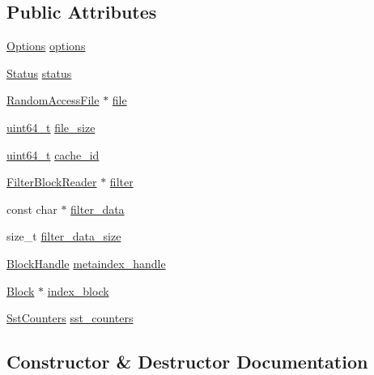 \subsection*{Public Attributes}
\begin{DoxyCompactItemize}
\item 
\hyperlink{structleveldb_1_1_options}{Options} \hyperlink{structleveldb_1_1_table_1_1_rep_a96ff2b389369e1b0706b090961065740}{options}
\item 
\hyperlink{classleveldb_1_1_status}{Status} \hyperlink{structleveldb_1_1_table_1_1_rep_aceaddad6024db9f34af2358503e4c089}{status}
\item 
\hyperlink{classleveldb_1_1_random_access_file}{Random\+Access\+File} $\ast$ \hyperlink{structleveldb_1_1_table_1_1_rep_a5b96b0d545bb3dbe2bccdefab1a83092}{file}
\item 
\hyperlink{stdint_8h_aaa5d1cd013383c889537491c3cfd9aad}{uint64\+\_\+t} \hyperlink{structleveldb_1_1_table_1_1_rep_a4efe31776f1009ac17b47cf2388bc84c}{file\+\_\+size}
\item 
\hyperlink{stdint_8h_aaa5d1cd013383c889537491c3cfd9aad}{uint64\+\_\+t} \hyperlink{structleveldb_1_1_table_1_1_rep_af5beb2186a60560f5381271ad53420b8}{cache\+\_\+id}
\item 
\hyperlink{classleveldb_1_1_filter_block_reader}{Filter\+Block\+Reader} $\ast$ \hyperlink{structleveldb_1_1_table_1_1_rep_a35acf83732a3dea3df5869cb05c1cb5f}{filter}
\item 
const char $\ast$ \hyperlink{structleveldb_1_1_table_1_1_rep_a2dd458aa96c0a357414f13354810cea9}{filter\+\_\+data}
\item 
size\+\_\+t \hyperlink{structleveldb_1_1_table_1_1_rep_aa46ec746cf191060a36bccc95e6662e7}{filter\+\_\+data\+\_\+size}
\item 
\hyperlink{classleveldb_1_1_block_handle}{Block\+Handle} \hyperlink{structleveldb_1_1_table_1_1_rep_a11500653a2db8ba301bca5027a508789}{metaindex\+\_\+handle}
\item 
\hyperlink{classleveldb_1_1_block}{Block} $\ast$ \hyperlink{structleveldb_1_1_table_1_1_rep_ae69d991c9b8ec7330b22acc06a932fe8}{index\+\_\+block}
\item 
\hyperlink{classleveldb_1_1_sst_counters}{Sst\+Counters} \hyperlink{structleveldb_1_1_table_1_1_rep_acec6573abf3f5d015604af777debbc91}{sst\+\_\+counters}
\end{DoxyCompactItemize}


\subsection{Constructor \& Destructor Documentation}
\hypertarget{structleveldb_1_1_table_1_1_rep_a589eccb49554eb53054c95f5e6b5aac3}{}
